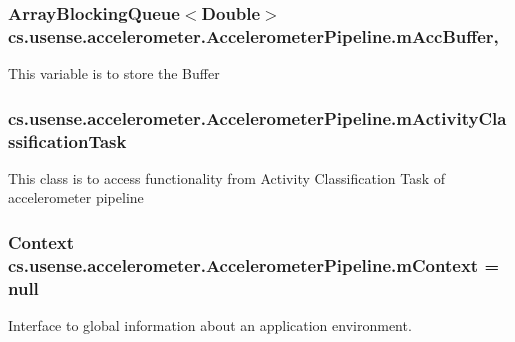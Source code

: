 \subsubsection[{m\+Acc\+Buffer}]{\setlength{\rightskip}{0pt plus 5cm}Array\+Blocking\+Queue$<$Double$>$ cs.\+usense.\+accelerometer.\+Accelerometer\+Pipeline.\+m\+Acc\+Buffer\hspace{0.3cm}{\ttfamily [static]}, {\ttfamily [private]}}\label{classcs_1_1usense_1_1accelerometer_1_1_accelerometer_pipeline_a2ca26caa30a7a702089708c1586147b1}
This variable is to store the Buffer \hypertarget{classcs_1_1usense_1_1accelerometer_1_1_accelerometer_pipeline_ac13ce7a2cbfab63d4c51e53494776cb4}{}
\subsubsection[{m\+Activity\+Classification\+Task}]{ cs.\+usense.\+accelerometer.\+Accelerometer\+Pipeline.\+m\+Activity\+Classification\+Task\hspace{0.3cm}{\ttfamily [private]}}\label{classcs_1_1usense_1_1accelerometer_1_1_accelerometer_pipeline_ac13ce7a2cbfab63d4c51e53494776cb4}
This class is to access functionality from Activity Classification Task of accelerometer pipeline \hypertarget{classcs_1_1usense_1_1accelerometer_1_1_accelerometer_pipeline_a3d0a51bf9ee496afd2b54f730465d7d0}{}
\subsubsection[{m\+Context}]{\setlength{\rightskip}{0pt plus 5cm}Context cs.\+usense.\+accelerometer.\+Accelerometer\+Pipeline.\+m\+Context = null\hspace{0.3cm}{\ttfamily [private]}}\label{classcs_1_1usense_1_1accelerometer_1_1_accelerometer_pipeline_a3d0a51bf9ee496afd2b54f730465d7d0}
Interface to global information about an application environment. \hypertarget{classcs_1_1usense_1_1accelerometer_1_1_accelerometer_pipeline_a86d5697845c1a5e4469c78de919cb6fe}{}
